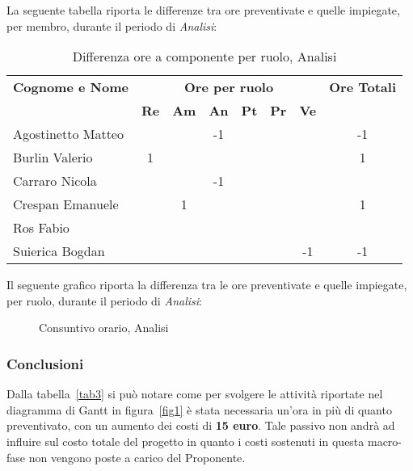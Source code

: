 \noindent La seguente tabella riporta le differenze tra ore preventivate e quelle impiegate, per membro, durante il periodo di \textit{Analisi}: 
\begin{table}[h]
\centering
\begin{tabular}{|l|c|c|c|c|c|c|c|}
	\toprule
	\textbf{Cognome e Nome} & \multicolumn{6}{c}{\textbf{Ore per ruolo}} & \textbf{Ore Totali} \\
	& \textbf{Re} & \textbf{Am} & \textbf{An} & \textbf{Pt} & \textbf{Pr} & \textbf{Ve} & \\
		
	\midrule
	Agostinetto Matteo & & & -1 & & & & -1 \\
	Burlin Valerio & 1 & & & & & & 1 \\ 
	Carraro Nicola & & & -1 & & & & \\
	Crespan Emanuele & & 1 & & & & & 1 \\
	Ros Fabio & & & & & & & \\
	Suierica Bogdan & & & & & & -1 & -1 \\
		
	\bottomrule
\end{tabular}
\caption{Differenza ore a componente per ruolo, Analisi}
\end{table}

\newpage
\noindent Il seguente grafico riporta la differenza tra le ore preventivate e quelle impiegate, per ruolo, durante il periodo di \textit{Analisi}:
\begin{figure}[h]
\centering
{}
\caption{Consuntivo orario, Analisi}
\end{figure}

\subsubsection{Conclusioni}
Dalla tabella~\ref{tab3} si può notare come per svolgere le attività riportate nel diagramma di \gls{Gantt} in figura~\ref{fig1} è stata necessaria un'ora in più di quanto preventivato, con un aumento dei costi di \textbf{15 euro}. Tale passivo non andrà ad influire sul costo totale del progetto in quanto i costi sostenuti in questa macro-fase non vengono poste a carico del Proponente.  

